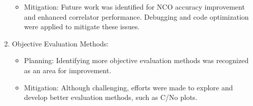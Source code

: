 \begin{enumerate}
\begin{itemize}
        \item Mitigation: Future work was identified for NCO accuracy improvement and enhanced correlator performance. Debugging and code optimization were applied to mitigate these issues.
    \end{itemize}
    \item Objective Evaluation Methods:
    \begin{itemize}
        \item Planning: Identifying more objective evaluation methods was recognized as an area for improvement.
        \item Mitigation: Although challenging, efforts were made to explore and develop better evaluation methods, such as C/No plots.
    \end{itemize}
\end{enumerate}







